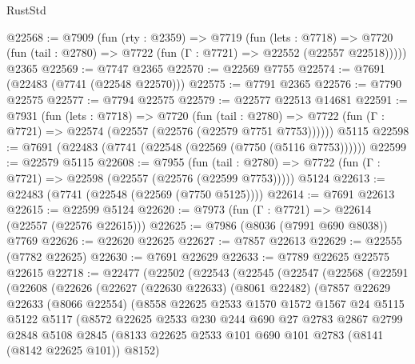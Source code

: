 \begin{lexlean}{RustStd}
\begin{coremodule}
@22568 := @7909
    (fun (rty : @2359) =>
    @7719
      (fun (lets : @7718) =>
      @7720 (fun (tail : @2780) => @7722 (fun (Γ : @7721) => @22552 (@22557 @22518)))))
    @2365
@22569 := @7747 @2365
@22570 := @22569 @7755
@22574 := @7691 (@22483 (@7741 (@22548 @22570)))
@22575 := @7791 @2365
@22576 := @7790 @22575
@22577 := @7794 @22575
@22579 := @22577 @22513 @14681
@22591 := @7931
    (fun (lets : @7718) =>
    @7720
      (fun (tail : @2780) =>
      @7722 (fun (Γ : @7721) => @22574 (@22557 (@22576 (@22579 @7751 @7753))))))
    @5115
@22598 := @7691 (@22483 (@7741 (@22548 (@22569 (@7750 (@5116 @7753))))))
@22599 := @22579 @5115
@22608 := @7955
    (fun (tail : @2780) => @7722 (fun (Γ : @7721) => @22598 (@22557 (@22576 (@22599 @7753)))))
    @5124
@22613 := @22483 (@7741 (@22548 (@22569 (@7750 @5125))))
@22614 := @7691 @22613
@22615 := @22599 @5124
@22620 := @7973 (fun (Γ : @7721) => @22614 (@22557 (@22576 @22615)))
@22625 := @7986 (@8036 (@7991 @690 @8038)) @7769
@22626 := @22620 @22625
@22627 := @7857 @22613
@22629 := @22555 (@7782 @22625)
@22630 := @7691 @22629
@22633 := @7789 @22625 @22575 @22615
@22718 := @22477
    (@22502
      (@22543
        (@22545
          (@22547
            (@22568
              (@22591
                (@22608
                  (@22626
                    (@22627
                      (@22630 @22633)
                      (@8061 @22482)
                      (@7857
                        @22629
                        @22633
                        (@8066 @22554)
                        (@8558
                          @22625
                          @2533
                          @1570
                          @1572
                          @1567
                          @24
                          @5115
                          @5122
                          @5117
                          (@8572
                            @22625
                            @2533
                            @230
                            @244
                            @690
                            @27
                            @2783
                            @2867
                            @2799
                            @2848
                            @5108
                            @2845
                            (@8133
                              @22625
                              @2533
                              @101
                              @690
                              @101
                              @2783
                              (@8141 (@8142 @22625 @101))
                              @8152)

\end{coremodule}
\end{lexlean}
